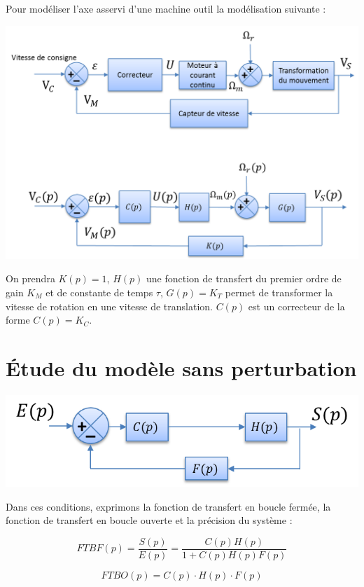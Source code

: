 \documentclass[10pt,oneside]{article}
\begin{document}
\begin{exemple}
Pour modéliser l'axe asservi d'une machine outil la modélisation suivante :
\begin{center}
\includegraphics[width=.6\textwidth]{png/bloc2}
\end{center}
On prendra $K(p)=1$, $H(p)$ une fonction de transfert du premier ordre de gain $K_M$ et de constante de temps $\tau$, $G(p)=K_T$ permet de transformer la vitesse de rotation en une vitesse de translation. $C(p)$ est un correcteur de la forme $C(p)=K_C$.
\end{exemple}


\section{Étude du modèle sans perturbation}


\begin{minipage}[c]{.48\linewidth}
\begin{center}
\includegraphics[width=.95\textwidth]{png/bloc11}
\end{center}
\end{minipage}\hfill
\begin{minipage}[c]{.48\linewidth}
Dans ces conditions, exprimons la fonction de transfert en boucle fermée, la fonction de transfert en boucle ouverte et la précision du système :

$$
FTBF(p)
=\dfrac{S(p)}{E(p)}
=\dfrac{C(p)H(p)}{1+C(p)H(p)F(p)}
$$

\end{minipage}


$$
FTBO(p) = C(p) \cdot H(p) \cdot F(p)
$$
\end{document}
